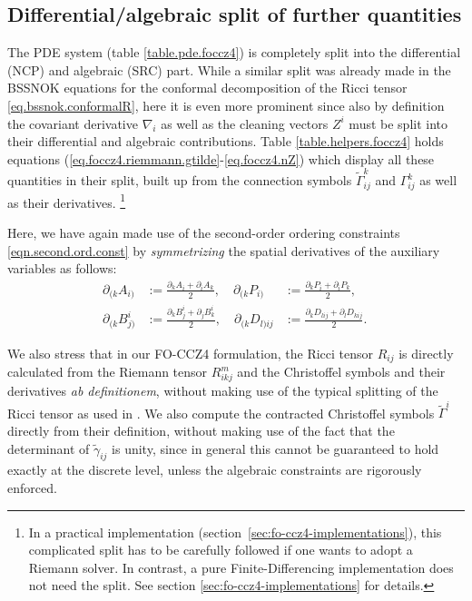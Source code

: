 \subsection*{Differential/algebraic split of further quantities}
The PDE system (table \ref{table.pde.foccz4}) is completely split into the
differential (NCP) and algebraic (SRC) part. While a similar split was
already made in the BSSNOK equations for the conformal decomposition
of the Ricci tensor \eqref{eq.bssnok.conformalR}, here it is even
more prominent since also by definition the covariant derivative $\nabla_i$
as well as the cleaning vectors $Z^i$ must be split into their differential
and algebraic contributions. Table \ref{table.helpers.foccz4} holds
equations (\ref{eq.foccz4.riemmann.gtilde}-\ref{eq.foccz4.nZ}) which display
all these quantities in their split, built up from the
connection symbols $\tilde{\Gamma}^k_{ij}$ and $\Gamma^k_{ij}$ as well
as their derivatives. \footnote{
	In a practical implementation 
    (section~\vref{sec:fo-ccz4-implementations}), this complicated split has
    to be carefully followed if one wants to adopt a Riemann solver.
    In contrast, a pure Finite-Differencing implementation does not need
    the split. See section \ref{sec:fo-ccz4-implementations} for details.
}

Here, we have again made use of the second-order ordering
constraints \eqref{eqn.second.ord.const} by \textit{symmetrizing}
the spatial derivatives of the auxiliary variables as follows:
%
\begin{equation}
\begin{aligned}
 \partial_{(k} {A}_{i)}     &:= \frac{ \partial_k A_i + \partial_i A_k       }{2}, \quad
 \partial_{(k} {P}_{i)}     &:= \frac{ \partial_k P_i + \partial_i P_k       }{2}, \quad
 \\
 \partial_{(k} {B}^i_{j)}   &:= \frac{ \partial_k B^i_j + \partial_j B^i_k     }{2}, \quad
 \partial_{(k} {D}_{l)ij}   &:= \frac{ \partial_k D_{lij} + \partial_l D_{kij} }{2}.
\end{aligned}\label{eqn.symm.aux}
\end{equation}

We also stress that in our FO-CCZ4
formulation, the Ricci tensor $R_{ij}$ is directly calculated from the
Riemann tensor $R^m_{ikj}$ and the Christoffel symbols and their
derivatives \textit{ab definitionem}, without making use of the typical
splitting of the Ricci tensor as \eg used in \cite{Alic:2011a}. We also
compute the contracted Christoffel symbols $\tilde{\Gamma}^i$ directly
from their definition, without making use of the fact that the
determinant of $\tilde{\gamma}_{ij}$ is unity, since in general this
cannot be guaranteed to hold exactly at the discrete level, unless the
algebraic constraints are rigorously enforced.

